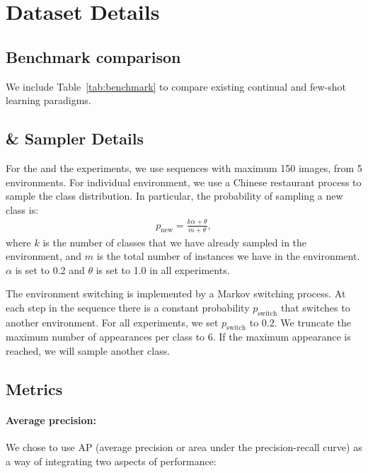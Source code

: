 \section{Dataset Details}
\label{app:data}

\subsection{Benchmark comparison}
We include Table~\ref{tab:benchmark} to compare existing continual and few-shot learning paradigms.

\subsection{\ourchar{} \& \ourimg{} Sampler Details}
For the \ourchar{} and the \ourimg{} experiments, we use sequences with maximum 150 images, from 5 environments. For
individual environment, we use a Chinese restaurant process to sample the class distribution. In
particular, the probability of sampling a new class is:
\begin{align}
p_\text{new} = \frac{k \alpha + \theta}{m + \theta},
\end{align}
where $k$ is the number of classes that we have already sampled in the environment, and $m$ is the
total number of instances we have in the environment. $\alpha$ is set to 0.2 and $\theta$ is set to
1.0 in all experiments.

The environment switching is implemented by a Markov switching process. At each step in the
sequence there is a constant probability $p_\text{switch}$ that switches to another environment. For
all experiments, we set $p_\text{switch}$ to 0.2. We truncate the maximum number of appearances
per class to 6. If the maximum appearance is reached, we will sample another class.

\subsection{Metrics}
\label{sec:metrics}
\paragraph{Average precision:} We chose to use AP (average precision or area under the precision-recall curve) as a way of integrating two aspects of performance:

